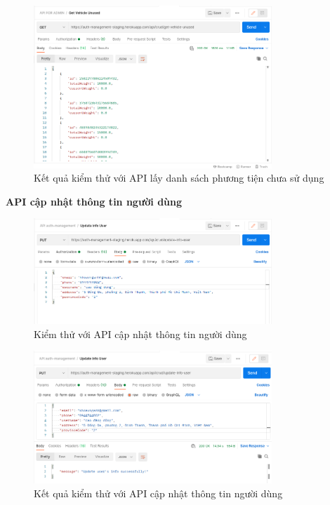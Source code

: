 		\begin{figure}[!ht]
			\includegraphics[width=0.8\textwidth]{Images/testing/API-get-vehicle-unused-result.png}
			\centering
			\linebreak
			\caption{Kết quả kiểm thử với API lấy danh sách phương tiện chưa sử dụng}
		\end{figure}
		
		\newpage
		
		\textbf{API cập nhật thông tin người dùng}
		
		\begin{figure}[!ht]
			\includegraphics[width=0.8\textwidth]{Images/testing/API-update-info-user.png}
			\centering
			\linebreak
			\caption{Kiểm thử với API cập nhật thông tin người dùng}
		\end{figure}
		
		\begin{figure}[!ht]
			\includegraphics[width=0.8\textwidth]{Images/testing/API-update-info-user-result.png}
			\centering
			\linebreak
			\caption{Kết quả kiểm thử với API cập nhật thông tin người dùng}
		\end{figure}
		
